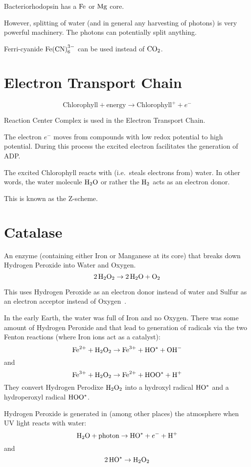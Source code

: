 \documentclass[a4paper,14pt]{extarticle}
\def\H{{\rm H}}
\def\O{{\rm O}}
\def\N{{\rm N}}
\def\C{{\rm C}}
\def\Fe{{\rm Fe}}
\def\Mg{{\rm Mg}}
\begin{document}
Bacteriorhodopsin has a $\Fe$ or $\Mg$ core.

However, splitting of water (and in general any harvesting of photons) is very powerful machinery. The photons can
potentially split anything.

Ferri-cyanide $\Fe{(\C\N)}_6^{3-}$ can be used instead of $\C\O_2$.

\section{Electron Transport Chain}
\[
    \text{Chlorophyll} + \text{energy} \rightarrow \text{Chlorophyll}^+ + e^-
\]

Reaction Center Complex is used in the Electron Transport Chain.

The electron $e^-$ moves from compounds with low redox potential to high potential. During this process
the excited electron facilitates the generation of ADP.\@

The excited Chlorophyll reacts with (i.e.\ steals electrons from) water.
In other words, the water molecule $\H_2\O$ or rather the $\H_2$ acts as an electron donor.

This is known as the Z-scheme.

\section{Catalase}
An enzyme (containing either Iron or Manganese at its core) that breaks down Hydrogen Peroxide into Water and Oxygen.
\[
    2\,\H_2\O_2 \rightarrow 2\,\H_2\O + \O_2
\]

This uses Hydrogen Peroxide as an electron donor instead of water and Sulfur as an electron acceptor instead of
Oxygen\ \cite{earlyanaerobicmetabolisms}.

In the early Earth, the water was full of Iron and no Oxygen. There was some amount of Hydrogen Peroxide and that lead
to generation of radicals via the two Fenton reactions (where Iron ions act as a catalyst):
\[
    \Fe^{2+} + \H_2\O_2 \rightarrow \Fe^{3+} + \H\O^{*} + \O\H^-
\]
and
\[
    \Fe^{3+} + \H_2\O_2 \rightarrow \Fe^{2+} + \H\O\O^{*} + \H^+
\]
They convert Hydrogen Perodixe $\H_2\O_2$ into a hydroxyl radical $\H\O^*$ and a hydroperoxyl radical
$\H\O\O^*$.

Hydrogen Peroxide is generated in (among other places) the atmosphere when UV light reacts with water:
\[
    \H_2\O + \text{photon} \rightarrow \H\O^* + e^- + \H^+
\]
and
\[
    2\,\H\O^* \rightarrow \H_2\O_2
\]
\end{document}
